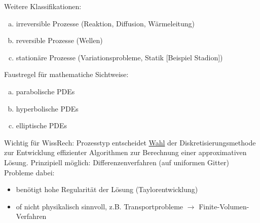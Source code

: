 Weitere Klassifikationen:
\begin{enumerate}[(a)]
    \item irreversible Prozesse (Reaktion, Diffusion, Wärmeleitung)
    \item reversible Prozesse (Wellen)
    \item stationäre Prozesse (Variationsprobleme, Statik [Beispiel Stadion])
\end{enumerate}

Faustregel für mathematiche Sichtweise:
\begin{enumerate}[(a) $\to$]
    \item parabolische PDEs
    \item hyperbolische PDEs
    \item elliptische PDEs
\end{enumerate}

Wichtig für WissRech: Prozesstyp entscheidet \underline{Wahl} der Diskretisierungsmethode zur Entwicklung effizienter Algorithmen zur Berechnung einer approximativen Lösung.
Prinzipiell möglich: Differenzenverfahren (auf uniformen Gitter)
Probleme dabei: 
\begin{itemize}
    \item benötigt hohe Regularität der Lösung (Taylorentwicklung)
        \item of nicht physikalisch sinnvoll, z.B. Transportprobleme $\to$ Finite-Volumen-Verfahren
\end{itemize}
